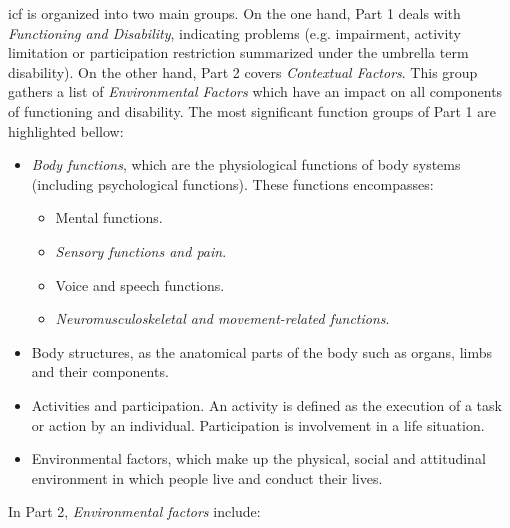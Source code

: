 \ac{icf} is organized into two main groups. On the one hand, Part 1 deals with 
\textit{Functioning and Disability}, indicating problems (e.g. impairment, 
activity limitation or participation restriction summarized under the umbrella 
term disability). On the other hand, Part 2 covers \textit{Contextual Factors}. 
This group gathers a list of \textit{Environmental Factors} which have an impact 
on all components of functioning and disability. The most significant function
groups of Part 1 are highlighted bellow:

\begin{itemize}
  \item \textit{Body functions}, which are the physiological functions of body 
  systems (including psychological functions). These functions encompasses:
    \begin{itemize}
      \item Mental functions.
      \item \textit{Sensory functions and pain}.
      \item Voice and speech functions.
      \item \textit{Neuromusculoskeletal and movement-related functions}.
    \end{itemize}
  \item Body structures, as the anatomical parts of the body such as organs, 
  limbs and their components.
  \item Activities and participation. An activity is defined as the execution of 
  a task or action by an individual. Participation is involvement in a life 
  situation.
  \item Environmental factors, which make up the physical, social and attitudinal
  environment in which people live and conduct their lives.
\end{itemize}

In Part 2, \textit{Environmental factors} include:


